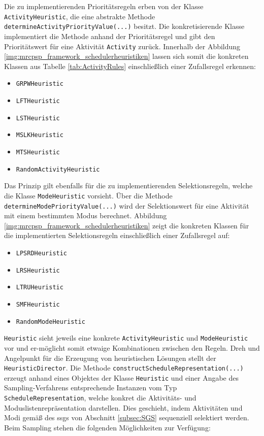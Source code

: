 Die zu implementierenden Prioritätsregeln erben von der Klasse \lstinline|ActivityHeuristic|, die eine abstrakte Methode \lstinline|determineActivityPriorityValue(...)| besitzt. Die konkretisierende Klasse implementiert die Methode anhand der Prioritätsregel und gibt den Prioritätswert für eine Aktivität \lstinline|Activity| zurück. Innerhalb der Abbildung \ref{img:mrcpsp_framework_schedulerheuristiken} lassen sich somit die konkreten Klassen aus Tabelle \ref{tab:ActivityRules} einschließlich einer Zufallsregel erkennen:
\begin{itemize}
    \item \lstinline|GRPWHeuristic|
    \item \lstinline|LFTHeuristic|
    \item \lstinline|LSTHeuristic|
    \item \lstinline|MSLKHeuristic|
    \item \lstinline|MTSHeuristic|
    \item \lstinline|RandomActivityHeuristic|
\end{itemize}
Das Prinzip gilt ebenfalls für die zu implementierenden Selektionsregeln, welche die Klasse \lstinline|ModeHeuristic| vorsieht. Über die Methode  \lstinline|determineModePriorityValue(...)| wird der Selektionswert für eine Aktivität mit einem bestimmten Modus berechnet. Abbildung \ref{img:mrcpsp_framework_schedulerheuristiken} zeigt die konkreten Klassen für die implementierten Selektionsregeln einschließlich einer Zufallsregel auf: 
\begin{itemize}
    \item \lstinline|LPSRDHeuristic|
    \item \lstinline|LRSHeuristic|
    \item \lstinline|LTRUHeuristic|
    \item \lstinline|SMFHeuristic|
    \item \lstinline|RandomModeHeuristic|
\end{itemize}
\lstinline|Heuristic| sieht jeweils eine konkrete \lstinline|ActivityHeuristic| und \lstinline|ModeHeuristic| vor und er-möglicht somit etwaige Kombinationen zwischen den Regeln. Dreh und Angelpunkt für die Erzeugung von heuristischen Lösungen stellt der \lstinline|HeuristicDirector|. Die Methode \lstinline|constructScheduleRepresentation(...)| erzeugt anhand eines Objektes der Klasse \lstinline|Heuristic| und einer Angabe des Sampling-Verfahrens entsprechende Instanzen vom Typ \lstinline|ScheduleRepresentation|, welche konkret die Aktivitäts- und Moduslistenrepräsentation darstellen. Dies geschieht, indem Aktivitäten und Modi gemäß des \ac{ssgs} von Abschnitt \ref{subsec:SGS} sequenziell selektiert werden. Beim Sampling stehen die folgenden Möglichkeiten zur Verfügung:

